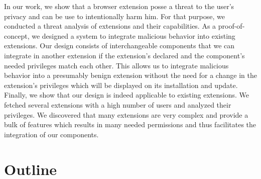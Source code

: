 	In our work, we show that a browser extension posse a threat to the user's privacy and can be use to intentionally harm him. For that purpose, we conducted a threat analysis of extensions and their capabilities. As a proof-of-concept, we designed a system to integrate malicious behavior into existing extensions. Our design consists of interchangeable components that we can integrate in another extension if the extension's declared and the component's needed privileges match each other. This allows us to integrate malicious behavior into a presumably benign extension without the need for a change in the extension's privileges which will be displayed on its installation and update. \\
	Finally, we show that our design is indeed applicable to existing extensions. We fetched several extensions with a high number of users and analyzed their privileges. We discovered that many extensions are very complex and provide a bulk of features which results in many needed permissions and thus facilitates the integration of our components. 

\section{Outline}

